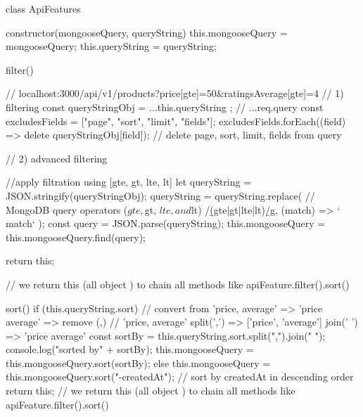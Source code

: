             class ApiFeatures {
                                constructor(mongooseQuery, queryString) {
                                    this.mongooseQuery = mongooseQuery;
                                    this.queryString = queryString;
                                }

                        filter() {
                            // localhost:3000/api/v1/products?price[gte]=50&ratingsAverage[gte]=4
                            // 1) filtering
                            const queryStringObj = { ...this.queryString }; // {...req.query}
                            const excludesFields = ["page", "sort", "limit", "fields"];
                            excludesFields.forEach((field) => delete queryStringObj[field]); // delete page, sort, limit, fields from query

                            // 2) advanced filtering

                            //apply filtration using [gte, gt, lte, lt]
                            let queryString = JSON.stringify(queryStringObj);
                            queryString = queryString.replace(
                            // MongoDB query operators ($gte, $gt, $lte, and $lt)
                            /\b(gte|gt|lte|lt)\b/g,
                            (match) => `$${match}`
                            );
                            const query = JSON.parse(queryString);
                            this.mongooseQuery = this.mongooseQuery.find(query);

                            return this;
                        }
                        // we return this (all object ) to chain all methods like apiFeature.filter().sort()

                        sort() {
                            if (this.queryString.sort) {
                            // convert from 'price, average' => 'price average' => remove (,)
                            // 'price, average' split(',') => ['price', 'average'] join(' ') => 'price average'
                            const sortBy = this.queryString.sort.split(",").join(" ");
                            console.log("sorted by" + sortBy);
                            this.mongooseQuery = this.mongooseQuery.sort(sortBy);
                            } else {
                            this.mongooseQuery = this.mongooseQuery.sort("-createdAt"); // sort by createdAt in descending order
                            }
                            return this;
                        }
                        // we return this (all object ) to chain all methods like apiFeature.filter().sort()

}
